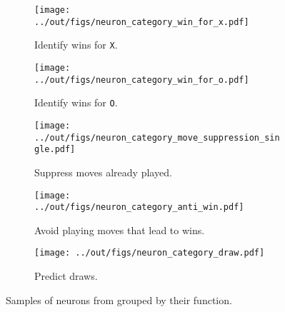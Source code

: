 \begin{figure}[t]
    \centering
    \begin{subfigure}[b]{0.49\linewidth}
        \texttt{[image: ../out/figs/neuron\_category\_win\_for\_x.pdf]}
        \caption{Identify wins for \texttt{X}.}
        \label{fig:neurons-x-win}
    \end{subfigure}%
    \hfill
    \begin{subfigure}[b]{0.49\linewidth}
        \texttt{[image: ../out/figs/neuron\_category\_win\_for\_o.pdf]}
        \caption{Identify wins for \texttt{O}.}
        \label{fig:neurons-o-win}
    \end{subfigure}
    \begin{subfigure}[b]{0.49\linewidth}
        \texttt{[image: ../out/figs/neuron\_category\_move\_suppression\_single.pdf]}
        \caption{Suppress moves already played.}
        \label{fig:neurons-suppress-single}
    \end{subfigure}%
    \hfill
    \begin{subfigure}[b]{0.49\linewidth}
        \texttt{[image: ../out/figs/neuron\_category\_anti\_win.pdf]}
        \caption{Avoid playing moves that lead to wins.}
        \label{fig:neurons-suppress-win}
    \end{subfigure}
    \begin{subfigure}[b]{0.49\linewidth}
        \texttt{[image: ../out/figs/neuron\_category\_draw.pdf]}
        \caption{Predict draws.}
    \end{subfigure}
    \caption{Samples of neurons from \ttgpt grouped by their function.}
    \label{fig:neuron-categories}
\end{figure}